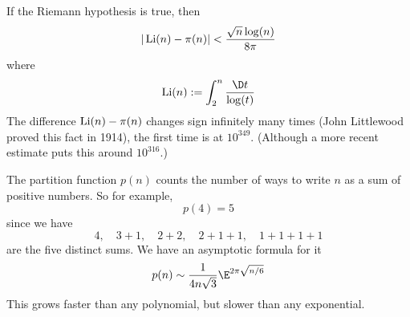 If the Riemann hypothesis is true, then
\begin{equation}
|\mathop{\mathrm{Li}}\nolimits(n)-\pi(n)|<\frac{\sqrt{n}\log(n)}{8\pi}
\end{equation}
where
\begin{equation}
\Li(n) := \int^{n}_{2}\frac{\D t}{\log(t)}
\end{equation}
The difference $\mathop{\mathrm{Li}}\nolimits(n)-\pi(n)$ changes sign infinitely many
times (John Littlewood proved this fact in 1914), the first time
is at $10^{349}$. (Although a more recent estimate puts this
around $10^{316}$.)

The partition function $p(n)$ counts the number of ways to write
$n$ as a sum of positive numbers. So for example,
\begin{equation}
p(4)=5
\end{equation}
since we have
\begin{equation}
4,\quad 3+1,\quad 2+2,\quad 2+1+1,\quad 1+1+1+1
\end{equation}
are the five distinct sums.
We have an asymptotic formula for it
\begin{equation}
p(n)\asymptote\frac{1}{4n\sqrt{3}}\E^{2\pi\sqrt{n/6}}
\end{equation}
This grows faster than any polynomial, but slower than any exponential.
